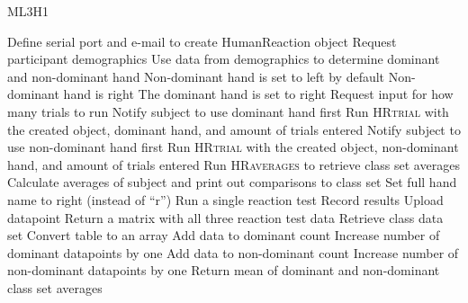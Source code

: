     \begin{algorithm}
      \caption{ML3H1}\label{ML3H1}
      \begin{algorithmic}[1]
        \State Define serial port and e-mail to create HumanReaction object
        \State Request participant demographics
        \State Use data from demographics to determine dominant and non-dominant hand
        \State Non-dominant hand is set to left by default
            \State Non-dominant hand is right
            \State The dominant hand is set to right
        \EndIf
        \State Request input for how many trials to run
        \State Notify subject to use dominant hand first
        \State Run \textsc{HRtrial} with the created object, dominant hand, and amount of trials entered
        \State Notify subject to use non-dominant hand first
        \State Run \textsc{HRtrial} with the created object, non-dominant hand, and amount of trials entered
        \State Run \textsc{HRaverages} to retrieve class set averages
        \State Calculate averages of subject and print out comparisons to class set
        \EndProcedure
        \vspace{5pt}
        \hline
        \vspace{5pt}
            \State Set full hand name to right (instead of ``r'')
        \EndIf
            \State Run a single reaction test
            \State Record results
            \State Upload datapoint
        \EndFor
        \State Return a matrix with all three reaction test data
        \EndProcedure
        \vspace{5pt}
        \hline
        \vspace{5pt}
        \State Retrieve class data set
        \State Convert table to an array
                \State Add data to dominant count
                \State Increase number of dominant datapoints by one
            \Else
                \State Add data to non-dominant count
                \State Increase number of non-dominant datapoints by one
            \EndIf
        \EndFor
        \State Return mean of dominant and non-dominant class set averages
        \EndProcedure
      \end{algorithmic}
    \end{algorithm}



